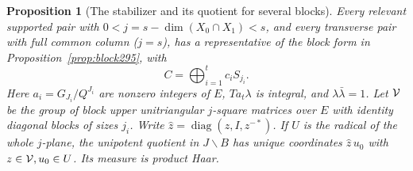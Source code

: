 \documentclass[a4paper,11pt]{article}
\newtheorem{proposition}{Proposition}[section]
\theoremstyle{definition}
\theoremstyle{remark}
\numberwithin{equation}{section}
\begin{document}
\begin{proposition}[The stabilizer and its quotient for several blocks]\leavevmode
\label{prop:composition298}
Every relevant supported pair with \(0<j=s-\dim(X_0\cap X_1)<s\),
and every transverse pair with full common column (\(j=s\)),
has a representative of the block form in
Proposition~\ref{prop:block295}, with
\[
           C=\bigoplus_{i=1}^t c_i S_{j_i}.
\]
Here \(a_i=G_{J_i}/Q^{J_i}\) are nonzero integers of \(E\),
\(Ta_t\lambda\) is integral, and \(\lambda\bar\lambda=1\).
Let \({\cal V}\) be the group of block upper unitriangular
\(j\)-square matrices over \(E\) with identity diagonal blocks
of sizes \(j_i\). Write \(\widehat z=\operatorname{diag}
(z,I,z^{-*})\). If \(U\) is the radical of the whole
\(j\)-plane, the unipotent quotient in \(J\backslash B\)
has unique coordinates \(\widehat z\,u_0\) with
\(z\in{\cal V},u_0\in U\). Its measure is product Haar.
\end{proposition}
\end{document}
